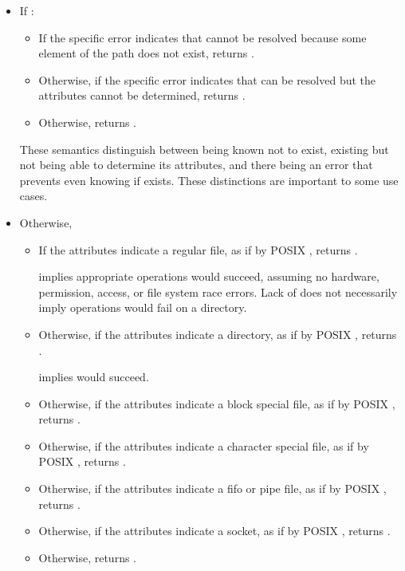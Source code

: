 \begin{itemdescr}
\pnum
\returns
\begin{itemize}
\item
If :
\begin{itemize}
\item If the specific error indicates that  cannot be resolved
      because some element of the path does not exist, returns
      .
\item Otherwise, if the specific error indicates that  can be resolved
      but the attributes cannot be determined, returns
      .
\item Otherwise, returns .
\end{itemize}
\begin{note} These semantics distinguish between  being known not to exist,  existing but not being able to determine its attributes,
        and there being an error that prevents even knowing if  exists. These
        distinctions are important to some use cases. \end{note}
\item
Otherwise,
\begin{itemize}
\item If the attributes indicate a regular file, as if by POSIX ,
      returns . \begin{note}
       implies appropriate  operations
      would succeed, assuming no hardware, permission, access, or file system
      race errors. Lack of  does not necessarily imply
       operations would fail on a directory.  \end{note}
\item Otherwise, if the attributes indicate a directory, as if by POSIX
      , returns .
      \begin{note}  implies
       would succeed.  \end{note}
\item Otherwise, if the attributes indicate a block special file, as if by
      POSIX , returns .
\item Otherwise, if the attributes indicate a character special file, as if
      by POSIX , returns .
\item Otherwise, if the attributes indicate a fifo or pipe file, as if by
      POSIX , returns .
\item Otherwise, if the attributes indicate a socket, as if by POSIX
      , returns .
\item Otherwise, returns .
\end{itemize}
\end{itemize}


\end{itemdescr}

